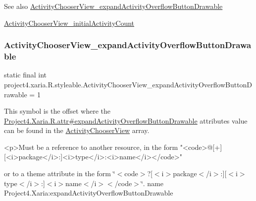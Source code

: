 \begin{DoxySeeAlso}{See also}
\hyperlink{classproject4_1_1xaria_1_1R_1_1styleable_a0bd7975ed1058630234848e0f2e49130}{Activity\+Chooser\+View\+\_\+expand\+Activity\+Overflow\+Button\+Drawable} 

\hyperlink{classproject4_1_1xaria_1_1R_1_1styleable_aa4cf4c159c65ab0d4b684efed6e9841d}{Activity\+Chooser\+View\+\_\+initial\+Activity\+Count} 
\end{DoxySeeAlso}
\mbox{\label{classproject4_1_1xaria_1_1R_1_1styleable_a0bd7975ed1058630234848e0f2e49130}} 
\subsubsection{\texorpdfstring{Activity\+Chooser\+View\+\_\+expand\+Activity\+Overflow\+Button\+Drawable}{ActivityChooserView\_expandActivityOverflowButtonDrawable}}
{\footnotesize\ttfamily static final int project4.\+xaria.\+R.\+styleable.\+Activity\+Chooser\+View\+\_\+expand\+Activity\+Overflow\+Button\+Drawable = 1\hspace{0.3cm}{\ttfamily [static]}}

This symbol is the offset where the \hyperlink{}{Project4.\+Xaria.\+R.\+attr\#expand\+Activity\+Overflow\+Button\+Drawable} attribute\textquotesingle{}s value can be found in the \hyperlink{classproject4_1_1xaria_1_1R_1_1styleable_a0e91fbde63d227499bc31d982f4a1131}{Activity\+Chooser\+View} array.

\begin{DoxyVerb}      <p>Must be a reference to another resource, in the form "<code>@[+][<i>package</i>:]<i>type</i>:<i>name</i></code>"
\end{DoxyVerb}
 or to a theme attribute in the form \char`\"{}$<$code$>$?\mbox{[}$<$i$>$package$<$/i$>$\+:\mbox{]}\mbox{[}$<$i$>$type$<$/i$>$\+:\mbox{]}$<$i$>$name$<$/i$>$$<$/code$>$\char`\"{}.  name Project4.\+Xaria\+:expand\+Activity\+Overflow\+Button\+Drawable \mbox{\label{classproject4_1_1xaria_1_1R_1_1styleable_aa4cf4c159c65ab0d4b684efed6e9841d}} 
